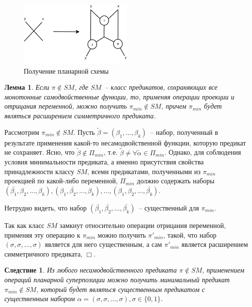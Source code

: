 \documentclass[12pt]{extarticle}
\newtheorem{lemma}[theorem]{Лемма}
\newtheorem{corollary}[theorem]{Следствие}
\newenvironment{proof}[1][Доказательство.]{\begin{trivlist}
\item[\hskip \labelsep {\bfseries #1}]}{\end{trivlist}}
\begin{document}
\begin{figure}[htb]
\centering
\includegraphics[width=0.5\textwidth]{intersection.png}
\caption{Получение планарной схемы}
\label{fig:xor}
\end{figure}

\begin{lemma}
\label{eq:lemma_sm}
Если $\pi \notin SM$, где $SM$~-- класс предикатов, сохраняющих все монотонные самодвойственные функции,
то, применяя операции проекции и отрицания переменной,
можно получить $\pi_{min} \notin SM$, причем $\pi_{min}$ будет являться расширением симметричного предиката.
\end{lemma}

\begin{proof}
Рассмотрим $\pi_{min} \notin SM$. Пусть $\widetilde{\beta} = (\beta_1, \dots, \beta_k)$~-- набор, полученный в результате
применения какой-то несамодвойственной функции, которую предикат не сохраняет.
Ясно, что $\widetilde{\beta} \notin \Pi_{min}$, т.е. $\widetilde{\beta} \neq \forall \widetilde{\alpha} \in \Pi_{min}$.
Однако, для соблюдения условия 
минимальности предиката, а именно присутствия свойства принадлежности классу $SM$, всеми предикатами, полученными
из $\pi_{min}$ проекцией по какой-либо переменной,
$\Pi_{min}$ должно содержать наборы 
$(\bar{\beta_1}, \beta_2, \dots, \beta_k), (\beta_1, \bar{\beta_2}, \dots, \beta_k), \dots, (\beta_1, \beta_2, \dots, \bar{\beta_k})$.

Нетрудно видеть, что набор $(\bar{\beta_1}, \bar{\beta_2}, \dots, \bar{\beta_k})$~-- существенный для $\pi_{min}$.

Так как класс $SM$ замкнут относительно операции отрицания переменной,
применяя эту операцию к $\pi_{min}$ можно получить $\pi'_{min}$,
такой, что набор $(\sigma, \sigma, \dots, \sigma)$ является для него существенным, а сам $\pi'_{min}$ является расширением 
симметричного предиката, $\Box$.
\end{proof}

\begin{corollary}
\label{lemma_sm_corollary} Из любого несамодвойственного предиката 
$\pi \notin SM $, применением операций планарной суперпозиции можно получить минимальный предикат $\pi_{min} \notin SM$,
который будет являться существенным предикатом с существенным набором
$ \alpha = (\sigma, \sigma, \dots, \sigma), \sigma \in \{0, 1\}$.
\end{corollary}
\end{document}
